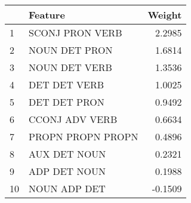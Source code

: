 \begin{tabular}{llr}
\toprule
{} &            Feature &  Weight \\
\midrule
1  &    SCONJ PRON VERB &  2.2985 \\
2  &      NOUN DET PRON &  1.6814 \\
3  &      NOUN DET VERB &  1.3536 \\
4  &       DET DET VERB &  1.0025 \\
5  &       DET DET PRON &  0.9492 \\
6  &     CCONJ ADV VERB &  0.6634 \\
7  &  PROPN PROPN PROPN &  0.4896 \\
8  &       AUX DET NOUN &  0.2321 \\
9  &       ADP DET NOUN &  0.1988 \\
10 &       NOUN ADP DET & -0.1509 \\
\bottomrule
\end{tabular}
